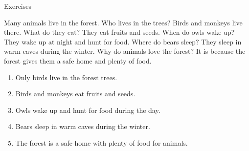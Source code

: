 \documentclass[aspectratio=169,xcolor={dvipsnames,table}]{beamer}
\begin{document}
\begin{frame}[plain,t]{Exercises}
\begin{tcolorbox}[colframe=ForestGreen,
  colback=NavyBlue!10!white,
  colbacktitle=NavyBlue!40!white,
  coltitle=black, %
before upper={\setlength{\parindent}{1.25em}},
 title={{}Animals in the Forest}{}\hfill{\tiny 0047}\,{\scriptsize \myaudio{./audio/020a_wh_reading_1.mp3}}
]
Many animals live in the forest.
Who lives in the trees? Birds and monkeys live there.
What do they eat? They eat fruits and seeds.
When do owls wake up? They wake up at night and hunt for food.
Where do bears sleep? They sleep in warm caves during the winter.
Why do animals love the forest?
It is because the forest gives them a safe home and plenty of food.

\end{tcolorbox}

\vspace{-4pt}
\vspace{-11pt}
\begin{enumerate}\setlength{\itemsep}{-3.2pt}
\item<2-> Only birds live in the forest trees.\hfill{}
\item<2-> Birds and monkeys eat fruits and seeds.\hfill{}
\item<2-> Owls wake up and hunt for food during the day.\hfill{}
\item<2-> Bears sleep in warm caves during the winter.\hfill{}
\item<2-> The forest is a safe home with plenty of food for animals.\hfill{}
\end{enumerate}
\end{frame}
\end{document}
